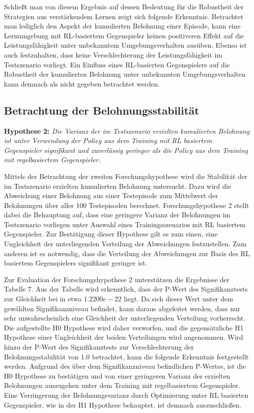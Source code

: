 Schließt man von diesem Ergebnis auf dessen Bedeutung für die Robustheit der Strategien aus verstärkendem Lernen zeigt sich folgende Erkenntnis.
Betrachtet man lediglich den Aspekt der kumulierten Belohnung einer Episode, kann eine Lernumgebung mit RL-basiertem Gegenspieler keinen positiveren Effekt auf die Leistungsfähigkeit unter unbekanntem Umgebungsverhalten ausüben.
Ebenso ist auch festzuhalten, dass keine Verschlechterung der Leistungsfähigkeit im Testszenario vorliegt. 
Ein Einfluss eines RL-basierten Gegenspielers auf die Robustheit der kumulierten Belohnung unter unbekannten Umgebungsverhalten kann demnach als nicht gegeben betrachtet werden.

\subsection{Betrachtung der Belohnungsstabilität}

\textbf{Hypothese 2:}
\textit{Die Varianz der im Testszenario erzielten kumulierten Belohnung ist unter Verwendung der Policy aus dem Training mit RL basiertem Gegenspieler signifikant und zuverlässig geringer als die Policy aus dem Training mit regelbasiertem Gegenspieler.}

Mittels der Betrachtung der zweiten Forschungshypothese wird die Stabilität der im Testszenario erzielten kumulierten Belohnung untersucht.
Dazu wird die Abweichung einer Belohnung aus einer Testepisode zum Mittelwert der Belohnungen über aller 100 Testepisoden berechnet.
Forschungshypothese 2 stellt dabei die Behauptung auf, dass eine geringere Varianz der Belohnungen im Testszenario vorliegen unter Auswahl eines Trainingsszenarios mit RL basiertem Gegenspieler. %
Zur Bestätigung dieser Hypothese gilt es zum einen, eine Ungleichheit der unterliegenden Verteilung der Abweichungen festzustellen.
Zum anderen ist es notwendig, dass die Verteilung der Abweichungen zur Basis des RL basiertem Gegenspielers signifikant geringer ist.

Zur Evaluation der Forschungshypothese 2 unterstützen die Ergebnisse der Tabelle 7.
Aus der Tabelle wird erkenntlich, dass der P-Wert des Signifikanztests zur Gleichheit bei in etwa $1.2200e-22$ liegt.
Da sich dieser Wert unter dem gewählten Signifikanzniveau befindet, kann daraus abgeleitet werden, dass nur sehr unwahrscheinlich eine Gleichheit der unterliegenden Verteilung vorherrscht.
Die aufgestellte H0 Hypothese wird daher verworfen, und die gegensätzliche H1 Hypothese einer Ungleichheit der beiden Verteilungen wird angenommen.
Wird hinzu der P-Wert des Signifikanztests zur Verschlechterung der Belohnungsstabilität von $1.0$ betrachtet, kann die folgende Erkenntnis festgestellt werden.
Aufgrund des über dem Signifikanzniveau befindlichen P-Wertes, ist die H0 Hypothese zu bestätigen und von einer geringeren Varianz der erzielten Belohnungen auszugehen unter dem Training mit regelbasiertem Gegenspieler.
Eine Verringerung der Belohnungsvarianz durch Optimierung unter RL basierten Gegenspieler, wie in der H1 Hypothese behauptet, ist demnach auszuschließen.

